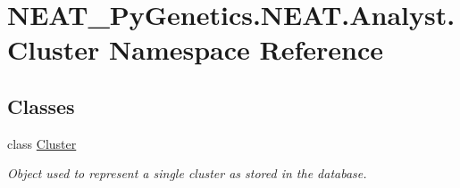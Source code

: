 \hypertarget{namespaceNEAT__PyGenetics_1_1NEAT_1_1Analyst_1_1Cluster}{}\section{N\+E\+A\+T\+\_\+\+Py\+Genetics.\+N\+E\+A\+T.\+Analyst.\+Cluster Namespace Reference}
\label{namespaceNEAT__PyGenetics_1_1NEAT_1_1Analyst_1_1Cluster}
\subsection*{Classes}
\begin{DoxyCompactItemize}
\item 
class \hyperlink{classNEAT__PyGenetics_1_1NEAT_1_1Analyst_1_1Cluster_1_1Cluster}{Cluster}
\begin{DoxyCompactList}\small\item\em Object used to represent a single cluster as stored in the database. \end{DoxyCompactList}\end{DoxyCompactItemize}
